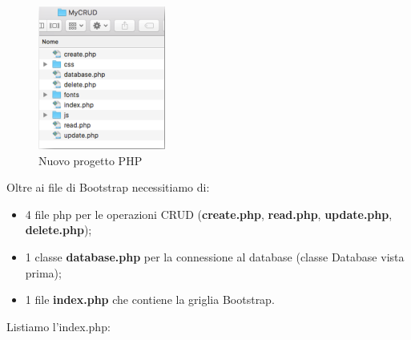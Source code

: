 \begin{center}
\begin{figure}[H]
\centering
\includegraphics[scale=1]{figures/newPHP.png}
\caption{Nuovo progetto PHP} 
\end{figure}
\end{center}

Oltre ai file di Bootstrap necessitiamo di:

\begin{itemize}

\item 4 file php per le operazioni CRUD (\textbf{create.php}, \textbf{read.php}, \textbf{update.php}, \textbf{delete.php});
\item 1 classe \textbf{database.php} per la connessione al database (classe Database vista prima);
\item 1 file \textbf{index.php} che contiene la griglia Bootstrap.

\end{itemize}

Listiamo l'index.php:

